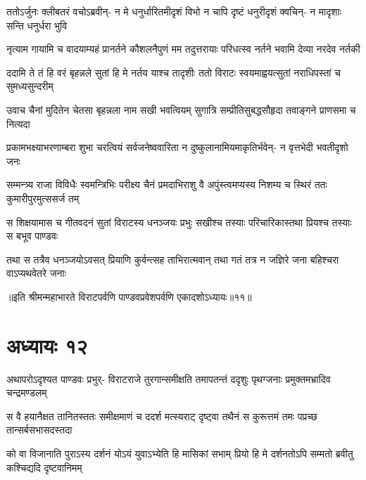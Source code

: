 \fourlineindentedshloka
{ततोऽर्जुनः क्लीबतरं वचोऽब्रवीन्-}
{न मे धनुर्धारितमीदृशं विभो}
{न चापि दृष्टं धनुरीदृशं क्वचिन्-}
{न मादृशाः सन्ति धनुर्धरा भुवि}


\fourlineindentedshloka
{नृत्याम गायामि च वादयाम्यहं}
{प्रानर्तने कौशलनैपुणं मम}
{तदुत्तरायाः परिधत्स्व नर्तने}
{भवामि देव्या नरदेव नर्तकी}




\fourlineindentedshloka
{ददामि ते तं हि वरं बृहन्नले}
{सुतां हि मे नर्तय याश्च तादृशीः}
{ततो विराटः स्वयमाह्वयत्सुतां}
{नराधिपस्तां च सुमध्यसुन्दरीम्}


\fourlineindentedshloka
{उवाच चैनां मुदितेन चेतसा}
{बृहन्नला नाम सखी भवत्वियम्}
{सुगात्रि सम्प्रीतिसुबद्धसौहृदा}
{तवाङ्गने प्राणसमा च नित्यदा}


\fourlineindentedshloka
{प्रकामभक्ष्याभरणाम्बरा शुभा}
{चरत्वियं सर्वजनेष्ववारिता}
{न दुष्कुलानामियमाकृतिर्भवेन्-}
{न वृत्तभेदी भवतीदृशो जनः}



\fourlineindentedshloka
{सम्मन्त्र्य राजा विविधैः स्वमन्त्रिभिः}
{परीक्ष्य चैनं प्रमदाभिराशु वै}
{अपुंस्त्वमप्यस्य निशम्य च स्थिरं}
{ततः कुमारीपुरमुत्ससर्ज तम्}


\fourlineindentedshloka
{स शिक्षयामास च गीतवदनं}
{सुतां विराटस्य धनञ्जयः प्रभुः}
{सखीश्च तस्याः परिचारिकास्तथा}
{प्रियश्च तस्याः स बभूव पाण्डवः}


\fourlineindentedshloka
{तथा स तत्रैव धनञ्जयोऽवसत्}
{प्रियाणि कुर्वन्त्सह ताभिरात्मवान्}
{तथा गतं तत्र न जज्ञिरे जना}
{बहिश्चरा वाऽप्यथवेतरे जनाः}

॥इति श्रीमन्महाभारते विराटपर्वणि पाण्डवप्रवेशपर्वणि एकादशोऽध्यायः॥११॥

\chapter{अध्यायः १२}

\fourlineindentedshloka
{अथापरोऽदृश्यत पाण्डवः प्रभुर्-}
{विराटराजे तुरगान्समीक्षति}
{तमापतन्तं ददृशुः पृथग्जनाः}
{प्रमुक्तमभ्रादिव चन्द्रमण्डलम्}


\fourlineindentedshloka
{स वै हयानैक्षत तानितस्ततः}
{समीक्षमाणं च ददर्श मत्स्यराट्}
{दृष्ट्वा तथैनं स कुरूत्तमं तमः}
{पप्रच्छ तान्सर्बसभासदस्तदा}


\fourlineindentedshloka
{को वा विजानाति पुराऽस्य दर्शनं}
{योऽयं युवाऽभ्येति हि मासिकां सभाम्}
{प्रियो हि मे दर्शनतोऽपि सम्मतो}
{ब्रवीतु कश्चिद्यदि दृष्टवानिमम्}


